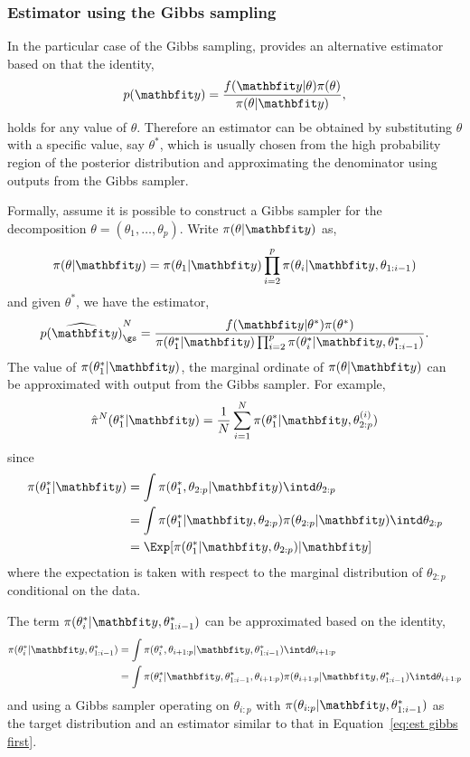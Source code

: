 \subsubsection{Estimator using the Gibbs sampling}
\label{ssub:Estimator using the Gibbs sampling}

In the particular case of the Gibbs sampling, \cite{Chib:1995em} provides an
alternative estimator based on that the identity,
\begin{equation}
  p(\data) = \frac{f(\data|\theta)\pi(\theta)}{\pi(\theta|\data)},
\end{equation}
holds for any value of $\theta$. Therefore an estimator can be obtained by
substituting $\theta$ with a specific value, say $\theta^*$, which is usually
chosen from the high probability region of the posterior distribution and
approximating the denominator using outputs from the Gibbs sampler.

Formally, assume it is possible to construct a Gibbs sampler for the
decomposition $\theta = (\theta_1,\dots,\theta_p)$. Write $\pi(\theta|\data)$
as,
\begin{equation}
  \pi(\theta|\data) = \pi(\theta_1|\data)
  \prod_{i=2}^p\pi(\theta_i|\data,\theta_{1:i-1})
\end{equation}
and given $\theta^*$, we have the estimator,
\begin{equation}
  \widehat{p(\data)}_{\gs}^N = \frac{f(\data|\theta^*)\pi(\theta^*)}
  {\pi(\theta_1^*|\data)
    \prod_{i=2}^p\pi(\theta_i^*|\data,\theta_{1:i-1}^*)}.
\end{equation}
The value of $\pi(\theta_1^*|\data)$, the marginal ordinate of
$\pi(\theta|\data)$ can be approximated with output from the Gibbs sampler.
For example,
\begin{equation}
  \hat\pi^N(\theta_1^*|\data)
  = \frac{1}{N}\sum_{i=1}^N \pi(\theta_1^*|\data,\theta_{2:p}^{(i)})
  \label{eq:est gibbs first}
\end{equation}
since
\begin{align*}
  \pi(\theta_1^*|\data)
  &= \int\pi(\theta_1^*, \theta_{2:p}|\data)\intd\theta_{2:p} \\
  &= \int\pi(\theta_1^*|\data,\theta_{2:p})
  \pi(\theta_{2:p}|\data)\intd\theta_{2:p} \\
  &= \Exp[\pi(\theta_1^*|\data,\theta_{2:p})|\data]
\end{align*}
where the expectation is taken with respect to the marginal distribution of
$\theta_{2:p}$ conditional on the data.

The term $\pi(\theta_i^*|\data,\theta_{1:i-1}^*)$ can be approximated based on
the identity,
\begin{align}
  \pi(\theta_i^*|\data,\theta_{1:i-1}^*)
  &= \int \pi(\theta_i^*,\theta_{i+1:p}|\data,\theta_{1:i-1}^*)
  \intd\theta_{i+1:p} \notag\\
  &= \int \pi(\theta_i^*|\data,\theta_{1:i-1}^*,\theta_{i+1:p})
  \pi(\theta_{i+1:p}|\data,\theta_{1:i-1}^*) \intd\theta_{i+1:p}
\end{align}
and using a Gibbs sampler operating on $\theta_{i:p}$ with
$\pi(\theta_{i:p}|\data,\theta_{1:i-1}^*)$ as the target distribution and an
estimator similar to that in Equation~\eqref{eq:est gibbs first}.

